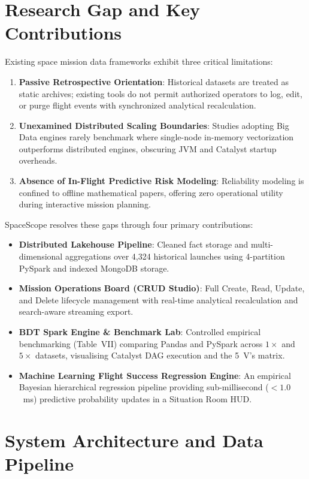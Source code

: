 \documentclass[10pt]{article}
\begin{document}
\section{Research Gap and Key Contributions}

Existing space mission data frameworks exhibit three critical limitations:
\begin{enumerate}
    \item \textbf{Passive Retrospective Orientation}: Historical datasets are treated as static archives; existing tools do not permit authorized operators to log, edit, or purge flight events with synchronized analytical recalculation.
    \item \textbf{Unexamined Distributed Scaling Boundaries}: Studies adopting Big Data engines rarely benchmark where single-node in-memory vectorization outperforms distributed engines, obscuring JVM and Catalyst startup overheads.
    \item \textbf{Absence of In-Flight Predictive Risk Modeling}: Reliability modeling is confined to offline mathematical papers, offering zero operational utility during interactive mission planning.
\end{enumerate}

SpaceScope resolves these gaps through four primary contributions:
\begin{itemize}
    \item \textbf{Distributed Lakehouse Pipeline}: Cleaned fact storage and multi-dimensional aggregations over 4,324 historical launches using 4-partition PySpark and indexed MongoDB storage.
    \item \textbf{Mission Operations Board (CRUD Studio)}: Full Create, Read, Update, and Delete lifecycle management with real-time analytical recalculation and search-aware streaming export.
    \item \textbf{BDT Spark Engine \& Benchmark Lab}: Controlled empirical benchmarking (Table~VII) comparing Pandas and PySpark across $1\times$ and $5\times$ datasets, visualising Catalyst DAG execution and the 5~V's matrix.
    \item \textbf{Machine Learning Flight Success Regression Engine}: An empirical Bayesian hierarchical regression pipeline providing sub-millisecond ($<1.0$~ms) predictive probability updates in a Situation Room HUD.
\end{itemize}

\section{System Architecture and Data Pipeline}
\end{document}
